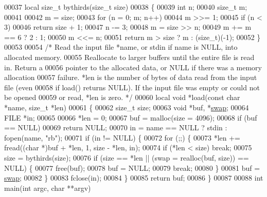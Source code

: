 \begin{DoxyCode}
{00037 local \textcolor{keywordtype}{size\_t} bythirds(\textcolor{keywordtype}{size\_t} size)
00038 \{
00039     \textcolor{keywordtype}{int} n;
00040     \textcolor{keywordtype}{size\_t} m;
00041 
00042     m = size;
00043     \textcolor{keywordflow}{for} (n = 0; m; n++)
00044         m >>= 1;
00045     \textcolor{keywordflow}{if} (n < 3)
00046         \textcolor{keywordflow}{return} size + 1;
00047     n -= 3;
00048     m = size >> n;
00049     m += m == 6 ? 2 : 1;
00050     m <<= n;
00051     \textcolor{keywordflow}{return} m > size ? m : (size\_t)(-1);
00052 \}
00053 
00054 \textcolor{comment}{/* Read the input file *name, or stdin if name is NULL, into allocated memory.}
00055 \textcolor{comment}{   Reallocate to larger buffers until the entire file is read in.  Return a}
00056 \textcolor{comment}{   pointer to the allocated data, or NULL if there was a memory allocation}
00057 \textcolor{comment}{   failure.  *len is the number of bytes of data read from the input file (even}
00058 \textcolor{comment}{   if load() returns NULL).  If the input file was empty or could not be opened}
00059 \textcolor{comment}{   or read, *len is zero. */}
00060 local \textcolor{keywordtype}{void} *load(\textcolor{keyword}{const} \textcolor{keywordtype}{char} *name, \textcolor{keywordtype}{size\_t} *len)
00061 \{
00062     \textcolor{keywordtype}{size\_t} size;
00063     \textcolor{keywordtype}{void} *buf, *\hyperlink{endian_8c_a3ca5ecd34b04d6a243c054ac3a57f68d}{swap};
00064     FILE *in;
00065 
00066     *len = 0;
00067     buf = malloc(size = 4096);
00068     \textcolor{keywordflow}{if} (buf == NULL)
00069         \textcolor{keywordflow}{return} NULL;
00070     in = name == NULL ? stdin : fopen(name, \textcolor{stringliteral}{"rb"});
00071     \textcolor{keywordflow}{if} (in != NULL) \{
00072         \textcolor{keywordflow}{for} (;;) \{
00073             *len += fread((\textcolor{keywordtype}{char} *)buf + *len, 1, size - *len, in);
00074             \textcolor{keywordflow}{if} (*len < size) \textcolor{keywordflow}{break};
00075             size = bythirds(size);
00076             \textcolor{keywordflow}{if} (size == *len || (swap = realloc(buf, size)) == NULL) \{
00077                 free(buf);
00078                 buf = NULL;
00079                 \textcolor{keywordflow}{break};
00080             \}
00081             buf = \hyperlink{endian_8c_a3ca5ecd34b04d6a243c054ac3a57f68d}{swap};
00082         \}
00083         fclose(in);
00084     \}
00085     \textcolor{keywordflow}{return} buf;
00086 \}
00087 
00088 \textcolor{keywordtype}{int} main(\textcolor{keywordtype}{int} argc, \textcolor{keywordtype}{char} **argv)
}
\end{DoxyCode}
